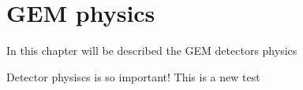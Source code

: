 \documentclass[]{book}
\begin{document}
\chapter{GEM physics}

In this chapter will be described the GEM detectors physics

Detector physiscs is so important! This is a new test 
\end{document}

